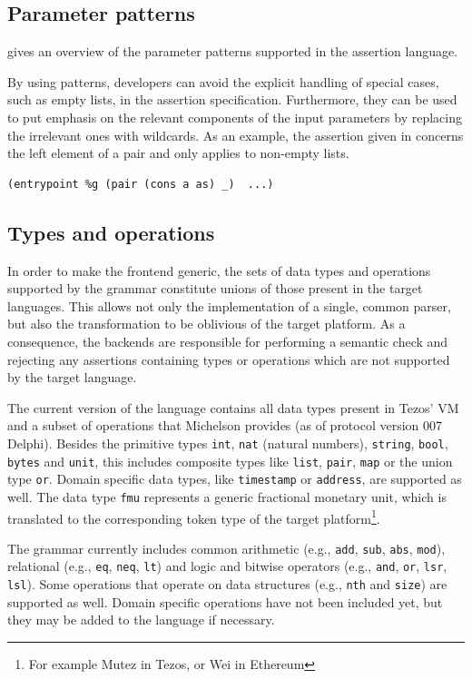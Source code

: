 \subsection{Parameter patterns}
 gives an overview of the parameter patterns supported in the assertion language.

By using patterns, developers can avoid the explicit handling of special cases, such as empty lists, in the assertion specification. Furthermore, they can be used to put emphasis on the relevant components of the input parameters by replacing the irrelevant ones with wildcards. As an example, the assertion given in  concerns the left element of a pair and only applies to non-empty lists. 
\begin{lstlisting}[label=lst:patterns_usage, language=Assertion, numbers=none]
(entrypoint %g (pair (cons a as) _)  ...)
\end{lstlisting}

\subsection{Types and operations}
In order to make the frontend generic, the sets of data types and operations supported by the grammar constitute unions of those present in the target languages. This allows not only the implementation of a single, common parser, but also the transformation to be oblivious of the target platform. As a consequence, the backends are responsible for performing a semantic check and  rejecting any assertions containing types or operations which are not supported by the target language.

The current version of the language contains all data types present in Tezos' VM and a subset of operations that Michelson provides (as of protocol version 007 Delphi). Besides the primitive types \texttt{int}, \texttt{nat} (natural numbers), \texttt{string}, \texttt{bool}, \texttt{bytes} and \texttt{unit}, this includes composite types like \texttt{list}, \texttt{pair}, \texttt{map} or the union type \texttt{or}. Domain specific data types, like \texttt{timestamp} or \texttt{address}, are supported as well. The data type \texttt{fmu} represents a generic fractional monetary unit, which is translated to the corresponding token type of the target platform\footnote{For example Mutez in Tezos, or Wei in Ethereum}.

The grammar currently includes common arithmetic (e.g., \texttt{add}, \texttt{sub}, \texttt{abs}, \texttt{mod}), relational  (e.g., \texttt{eq}, \texttt{neq}, \texttt{lt}) and logic and bitwise operators (e.g., \texttt{and}, \texttt{or}, \texttt{lsr}, \texttt{lsl}). Some operations that operate on data structures (e.g., \texttt{nth} and \texttt{size}) are supported as well. Domain specific operations have not been included yet, but they may be added to the language if necessary. 

